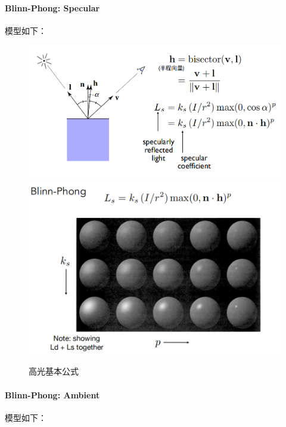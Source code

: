 \documentclass[UTF8,a4paper,12pt]{ctexbook}
\begin{document}
			\paragraph{Blinn-Phong: Specular}
				模型如下：
				
				\begin{figure}[H]
					\includegraphics[width=\linewidth]{LightBasic-02}
					\includegraphics[width=\linewidth]{LightBasic-03}
					\caption{高光基本公式}
				\end{figure}				
			
			\paragraph{Blinn-Phong: Ambient}
				模型如下：
				
\end{document}
